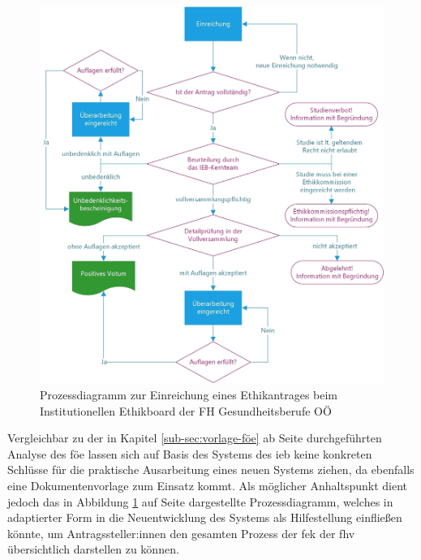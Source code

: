 \documentclass[a4paper,12pt,twoside]{scrreprt}
\begin{document}
\begin{figure}[ht]
    \centering
    \includegraphics[scale=0.15]{thesis/images/FHGOOE_Prozess-Ethikantrag.jpg}
    \caption[Prozessdiagramm zur Einreichung eines Ethikantrages beim Institutionellen Ethikboard der FH Gesundheitsberufe OÖ]{Prozessdiagramm zur Einreichung eines Ethikantrages beim Institutionellen Ethikboard der FH Gesundheitsberufe OÖ \cite{fh_gesundheitsberufe_oo_gmbh_einreichung_2023}}
    \label{fig:prozess-ethikantrag-ieb}
\end{figure}

Vergleichbar zu der in Kapitel \ref{sub-sec:vorlage-föe} ab Seite \pageref{sub-sec:vorlage-föe} durchgeführten Analyse des \ac{föe} lassen sich auf Basis des Systems des \ac{ieb} keine konkreten Schlüsse für die praktische Ausarbeitung eines neuen Systems ziehen, da ebenfalls eine Dokumentenvorlage zum Einsatz kommt. Als möglicher Anhaltspunkt dient jedoch das in Abbildung \ref{fig:prozess-ethikantrag-ieb} auf Seite \pageref{fig:prozess-ethikantrag-ieb} dargestellte Prozessdiagramm, welches in adaptierter Form in die Neuentwicklung des Systems als Hilfestellung einfließen könnte, um Antragssteller:innen den gesamten Prozess der \ac{fek} der \ac{fhv} übersichtlich darstellen zu können.
\end{document}
